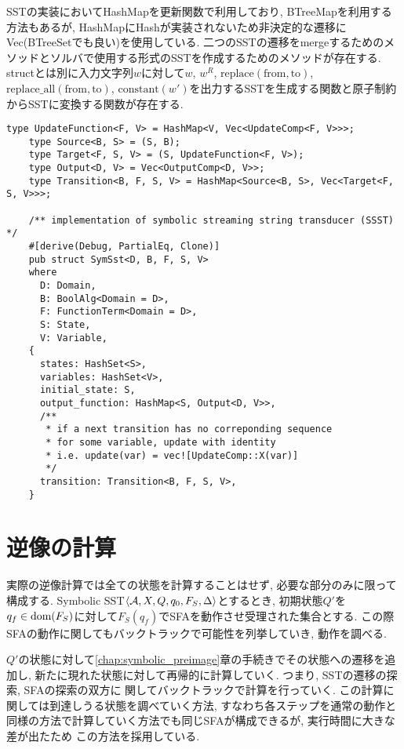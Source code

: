 \documentclass[uplatex,dvipdfmx,a4j]{jsreport}
\begin{document}
  SSTの実装においてHashMapを更新関数で利用しており, BTreeMapを利用する方法もあるが,
  HashMapにHashが実装されないため非決定的な遷移にVec(BTreeSetでも良い)を使用している.
  二つのSSTの遷移をmergeするためのメソッドとソルバで使用する形式のSSTを作成するためのメソッドが存在する.
  structとは別に入力文字列$w$に対して$w$, $w^R$,
  $\mbox{replace}(\mbox{from}, \mbox{to})$, $\mbox{replace\_all}(\mbox{from}, \mbox{to})$,
  $\mbox{constant}(w')$を出力するSSTを生成する関数と原子制約からSSTに変換する関数が存在する.
  \begin{lstlisting}[caption=SST, label=sst_impl]
    type UpdateFunction<F, V> = HashMap<V, Vec<UpdateComp<F, V>>>;
    type Source<B, S> = (S, B);
    type Target<F, S, V> = (S, UpdateFunction<F, V>);
    type Output<D, V> = Vec<OutputComp<D, V>>;
    type Transition<B, F, S, V> = HashMap<Source<B, S>, Vec<Target<F, S, V>>>;

    /** implementation of symbolic streaming string transducer (SSST) */
    #[derive(Debug, PartialEq, Clone)]
    pub struct SymSst<D, B, F, S, V>
    where
      D: Domain,
      B: BoolAlg<Domain = D>,
      F: FunctionTerm<Domain = D>,
      S: State,
      V: Variable,
    {
      states: HashSet<S>,
      variables: HashSet<V>,
      initial_state: S,
      output_function: HashMap<S, Output<D, V>>,
      /**
       * if a next transition has no correponding sequence
       * for some variable, update with identity
       * i.e. update(var) = vec![UpdateComp::X(var)]
       */
      transition: Transition<B, F, S, V>,
    }
  \end{lstlisting}

  \section{逆像の計算}

  実際の逆像計算では全ての状態を計算することはせず, 必要な部分のみに限って構成する.
  Symbolic SST${\langle {\mathcal{A}, X, Q, q_0, F_S, \Delta} \rangle}$とするとき,
  初期状態$Q'$を$q_f \in \mbox{dom}(F_S)$に対して$F_S(q_f)$でSFAを動作させ受理された集合とする.
  この際SFAの動作に関してもバックトラックで可能性を列挙していき, 動作を調べる.

  $Q'$の状態に対して\ref{chap:symbolic_preimage}章の手続きでその状態への遷移を追加し,
  新たに現れた状態に対して再帰的に計算していく. つまり, SSTの遷移の探索, SFAの探索の双方に
  関してバックトラックで計算を行っていく. この計算に関しては到達しうる状態を調べていく方法,
  すなわち各ステップを通常の動作と同様の方法で計算していく方法でも同じSFAが構成できるが, 実行時間に大きな差が出たため
  この方法を採用している.
\end{document}
